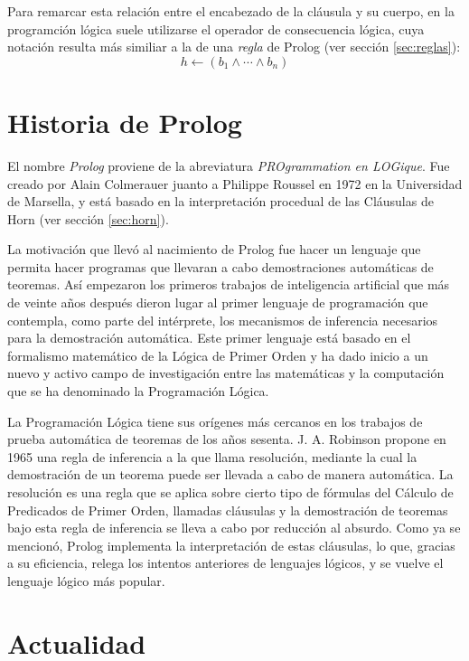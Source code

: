 \documentclass[12pt,titlepage]{article}
\begin{document}
Para remarcar esta relación entre el encabezado de la cláusula y su cuerpo, en la programción lógica suele utilizarse el operador de consecuencia lógica, cuya notación resulta más similiar a la de una \emph{regla} de Prolog (ver sección \ref{sec:reglas}):
\begin{equation*} 
h \leftarrow (b_1 \land \cdots \land b_n)
\end{equation*}

\newpage
\section{Historia de Prolog}

El nombre \textit{Prolog} proviene de la abreviatura \textit{PROgrammation en LOGique}. Fue creado por Alain Colmerauer juanto a Philippe Roussel en 1972 en la Universidad de Marsella, y está basado en la interpretación procedual de las Cláusulas de Horn (ver sección \ref{sec:horn}).

La motivación que llevó al nacimiento de Prolog fue hacer un lenguaje que permita hacer programas que llevaran a cabo demostraciones automáticas de teoremas. Así empezaron los primeros trabajos de inteligencia artificial que más de veinte años después dieron lugar al primer lenguaje de programación que contempla, como parte del intérprete, los mecanismos de inferencia necesarios para la demostración automática. Este primer lenguaje está basado en el formalismo matemático de la Lógica de Primer Orden y ha dado inicio a un nuevo y activo campo de investigación entre las matemáticas y la computación que se ha denominado la Programación Lógica.

La Programación Lógica tiene sus orígenes más cercanos en los trabajos de prueba automática de teoremas de los años sesenta. J. A. Robinson propone en 1965 una regla de inferencia a la que llama resolución, mediante la cual la demostración de un teorema puede ser llevada a cabo de manera automática. La resolución es una regla que se aplica sobre cierto tipo de fórmulas del Cálculo de Predicados de Primer Orden, llamadas cláusulas y la demostración de teoremas bajo esta regla de inferencia se lleva a cabo por reducción al absurdo. Como ya se mencionó, Prolog implementa la interpretación de estas cláusulas, lo que, gracias a su eficiencia, relega los intentos anteriores de lenguajes lógicos, y se vuelve el lenguaje lógico más popular.

\newpage
\section{Actualidad}
\end{document}
